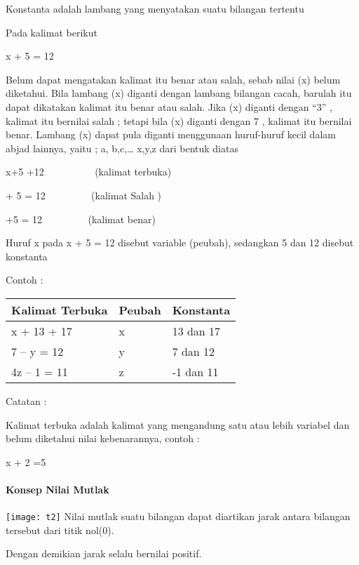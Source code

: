 \documentclass[11pt,fleqn]{book} %
\begin{document}
\noindent Konstanta adalah lambang yang menyatakan suatu bilangan tertentu

\noindent Pada kalimat berikut 

\noindent x + 5 = 12

Belum dapat mengatakan kalimat itu benar atau salah, sebab nilai (x) belum diketahui. Bila lambang (x) diganti dengan lambang bilangan cacah, barulah itu dapat dikatakan kalimat itu benar atau salah. Jika (x) diganti dengan ``3'' , kalimat itu bernilai salah ; tetapi bila (x) diganti dengan 7 , kalimat itu bernilai benar. Lambang (x) dapat pula diganti menggunaan huruf-huruf kecil dalam abjad lainnya, yaitu ; a, b,c,{\dots} x,y,z dari bentuk diatas

\noindent x+5 +12 ~~~~~~~~~ (kalimat terbuka)

+ 5 = 12 ~~~~~~~ ~(kalimat Salah )

+5 = 12 ~~~~~~~~ (kalimat benar)

\noindent Huruf x pada x + 5 = 12 disebut variable (peubah), sedangkan 5 dan 12 disebut konstanta

\noindent Contoh :

\noindent 

\begin{tabular}{|p{2.1in}|p{0.7in}|p{1.1in}|} \hline 
\textbf{Kalimat Terbuka} & \textbf{Peubah} & \textbf{Konstanta} \\ \hline 
x + 13 + 17 & x & 13 dan 17 \\ \hline 
7 -- y = 12 & y & 7 dan 12 \\ \hline 
4z -- 1 = 11 & z & -1 dan 11 \\ \hline 
\end{tabular}

Catatan :

\noindent Kalimat terbuka adalah kalimat yang mengandung satu atau lebih variabel dan belum diketahui nilai kebenarannya, contoh :

\noindent x + 2 =5

\noindent 


\paragraph{ Konsep Nilai Mutlak}

\texttt{[image: t2]} Nilai mutlak suatu bilangan dapat diartikan jarak antara bilangan tersebut dari titik nol(0). 

Dengan demikian jarak selalu bernilai positif.
\end{document}
